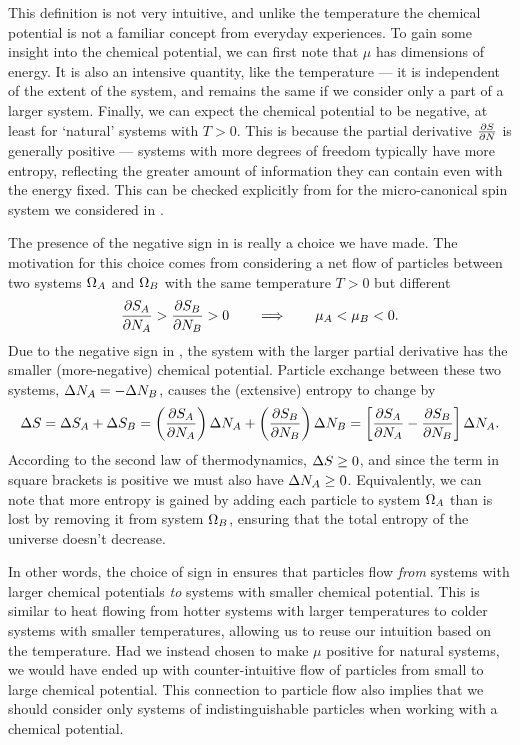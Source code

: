 This definition is not very intuitive, and unlike the temperature the chemical potential is not a familiar concept from everyday experiences.
To gain some insight into the chemical potential, we can first note that $\mu$ has dimensions of energy. %
It is also an intensive quantity, like the temperature --- it is independent of the extent of the system, and remains the same if we consider only a part of a larger system.
Finally, we can expect the chemical potential to be negative, at least for `natural' systems with $T > 0$.
This is because the partial derivative $\frac{\partial S}{\partial N}$ is generally positive --- systems with more degrees of freedom typically have more entropy, reflecting the greater amount of information they can contain even with the energy fixed.
This can be checked explicitly from  for the micro-canonical spin system we considered in .

The presence of the negative sign in  is really a choice we have made.
The motivation for this choice comes from considering a net flow of particles between two systems $\Omega_A$ and $\Omega_B$ with the same temperature $T > 0$ but different
\begin{equation*}
  \frac{\partial S_A}{\partial N_A} > \frac{\partial S_B}{\partial N_B} > 0 \qquad \Longrightarrow \qquad \mu_A < \mu_B < 0.
\end{equation*}
Due to the negative sign in , the system with the larger partial derivative has the smaller (more-negative) chemical potential.
Particle exchange between these two systems, $\Delta N_A = -\Delta N_B$, causes the (extensive) entropy to change by
\begin{equation*}
  \Delta S = \Delta S_A + \Delta S_B = \left(\frac{\partial S_A}{\partial N_A}\right) \Delta N_A + \left(\frac{\partial S_B}{\partial N_B}\right) \Delta N_B = \left[\frac{\partial S_A}{\partial N_A} - \frac{\partial S_B}{\partial N_B}\right] \Delta N_A.
\end{equation*}
According to the second law of thermodynamics, $\Delta S \geq 0$, and since the term in square brackets is positive we must also have $\Delta N_A \geq 0$.
Equivalently, we can note that more entropy is gained by adding each particle to system $\Omega_A$ than is lost by removing it from system $\Omega_B$, ensuring that the total entropy of the universe doesn't decrease.

In other words, the choice of sign in  ensures that particles flow \textit{from} systems with larger chemical potentials \textit{to} systems with smaller chemical potential.
This is similar to heat flowing from hotter systems with larger temperatures to colder systems with smaller temperatures, allowing us to reuse our intuition based on the temperature.
Had we instead chosen to make $\mu$ positive for natural systems, we would have ended up with counter-intuitive flow of particles from small to large chemical potential.
This connection to particle flow also implies that we should consider only systems of indistinguishable particles when working with a chemical potential. %

